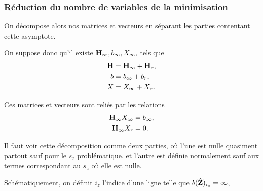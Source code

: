 \subsubsection{Réduction du nombre de variables de la minimisation}

On décompose alors nos matrices et vecteurs en séparant les parties contentant cette asymptote.

On suppose donc qu'il existe \({\mathbf{H}}_\infty, {b}_\infty, X_\infty,\) tels que
\begin{align*}
  {\mathbf{H}} &= {\mathbf{H}}_\infty + {\mathbf{H}}_r,
  \\
  {b} &= {b}_\infty + {b}_r,
  \\
  X &= X_\infty + X_r.
\end{align*}

Ces matrices et vecteurs sont reliés par les relations
\begin{align}
  {\mathbf{H}}_\infty X_\infty &= {b}_\infty,
  \\
  {\mathbf{H}}_\infty X_r &= 0.
\end{align}

Il faut voir cette décomposition comme deux parties, où l'une est nulle quasiment partout sauf pour le \(s_z\) problématique, et l'autre est définie normalement sauf aux termes correspondant au \(s_z\) où elle est nulle.

Schématiquement, on définit \(i_z\) l'indice d'une ligne telle que \({b}(\hat{\mathbf{Z}})_{i_z} = \infty\), 

